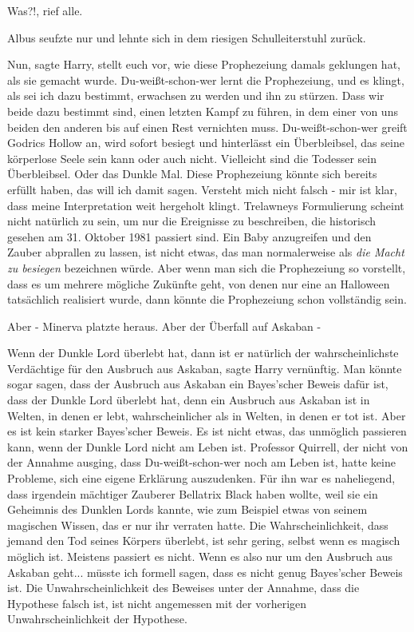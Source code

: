 \glqq Was?!\grqq{}, rief alle.

Albus seufzte nur und lehnte sich in dem riesigen Schulleiterstuhl zurück.

\glqq Nun\grqq{}, sagte Harry, \glqq stellt euch vor, wie diese Prophezeiung
damals geklungen hat, als sie gemacht wurde. Du-weißt-schon-wer lernt die
Prophezeiung, und es klingt, als sei ich dazu bestimmt, erwachsen zu werden und
ihn zu stürzen. Dass wir beide dazu bestimmt sind, einen letzten Kampf zu
führen, in dem einer von uns beiden den anderen bis auf einen Rest vernichten
muss. Du-weißt-schon-wer greift Godrics Hollow an, wird sofort besiegt und
hinterlässt ein Überbleibsel, das seine körperlose Seele sein kann oder auch
nicht. Vielleicht sind die Todesser sein Überbleibsel. Oder das Dunkle Mal.
Diese Prophezeiung könnte sich bereits erfüllt haben, das will ich damit sagen.
Versteht mich nicht falsch - mir ist klar, dass meine Interpretation weit
hergeholt klingt. Trelawneys Formulierung scheint nicht natürlich zu sein, um
nur die Ereignisse zu beschreiben, die historisch gesehen am 31. Oktober 1981
passiert sind. Ein Baby anzugreifen und den Zauber abprallen zu lassen, ist
nicht etwas, das man normalerweise als \emph{\glqq die Macht zu besiegen}\grqq{}
bezeichnen würde. Aber wenn man sich die Prophezeiung so vorstellt, dass es um
mehrere mögliche Zukünfte geht, von denen nur eine an Halloween tatsächlich
realisiert wurde, dann könnte die Prophezeiung schon vollständig sein.\grqq{}

\glqq Aber -\grqq{} Minerva platzte heraus. \glqq Aber der Überfall auf Askaban
-\grqq{}

\glqq Wenn der Dunkle Lord überlebt hat, dann ist er natürlich der
wahrscheinlichste Verdächtige für den Ausbruch aus Askaban\grqq{}, sagte Harry
vernünftig. \glqq Man könnte sogar sagen, dass der Ausbruch aus Askaban ein
Bayes'scher Beweis dafür ist, dass der Dunkle Lord überlebt hat, denn ein
Ausbruch aus Askaban ist in Welten, in denen er lebt, wahrscheinlicher als in
Welten, in denen er tot ist. Aber es ist kein starker Bayes'scher Beweis. Es ist
nicht etwas, das unmöglich passieren kann, wenn der Dunkle Lord nicht am Leben
ist. Professor Quirrell, der nicht von der Annahme ausging, dass
Du-weißt-schon-wer noch am Leben ist, hatte keine Probleme, sich eine eigene
Erklärung auszudenken. Für ihn war es naheliegend, dass irgendein mächtiger
Zauberer Bellatrix Black haben wollte, weil sie ein Geheimnis des Dunklen Lords
kannte, wie zum Beispiel etwas von seinem magischen Wissen, das er nur ihr
verraten hatte. Die Wahrscheinlichkeit, dass jemand den Tod seines Körpers
überlebt, ist sehr gering, selbst wenn es magisch möglich ist. Meistens passiert
es nicht. Wenn es also nur um den Ausbruch aus Askaban geht... müsste ich
formell sagen, dass es nicht genug Bayes'scher Beweis ist. Die
Unwahrscheinlichkeit des Beweises unter der Annahme, dass die Hypothese falsch
ist, ist nicht angemessen mit der vorherigen Unwahrscheinlichkeit der
Hypothese.\grqq{}

